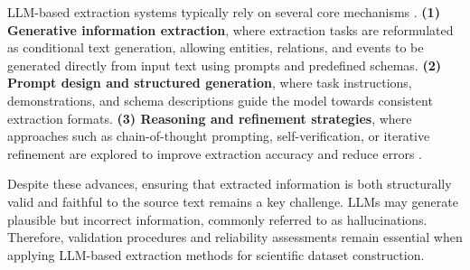 LLM-based extraction systems typically rely on several core mechanisms \cite{gao2023llmsgenie}. 
\textbf{(1) Generative information extraction}, where extraction tasks are reformulated as conditional text generation, allowing entities, relations, and events to be generated directly from input text using prompts and predefined schemas. 
\textbf{(2) Prompt design and structured generation}, where task instructions, demonstrations, and schema descriptions guide the model towards consistent extraction formats. 
\textbf{(3) Reasoning and refinement strategies}, where approaches such as chain-of-thought prompting, self-verification, or iterative refinement are explored to improve extraction accuracy and reduce errors \cite{gao2023llmsgenie}.

Despite these advances, ensuring that extracted information is both structurally valid and faithful to the source text remains a key challenge. LLMs may generate plausible but incorrect information, commonly referred to as hallucinations. Therefore, validation procedures and reliability assessments remain essential when applying LLM-based extraction methods for scientific dataset construction.